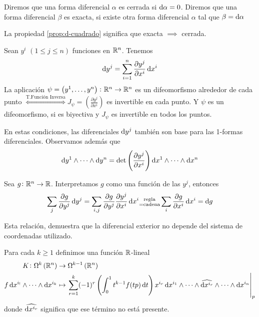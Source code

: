\begin{defi}
    Diremos que una forma diferencial $\alpha$ es cerrada si $\dif \alpha =0$. Diremos que una forma diferencial $\beta$ es exacta, si existe otra
    forma diferencial $\alpha$ tal que $\beta = \dif \alpha$
\end{defi}

\begin{obs*}
    La propiedad \ref{prop:d-cuadrado} significa que exacta $\implies$ cerrada.
\end{obs*}

\begin{prop}
    Sean $y^i$ $(1 \leq j \leq n)$ funciones en $\mathbb{R}^n$. Tenemos
    \[
        \dif y^j = \sum^n_{i=1} \frac{\partial y^j}{\partial x^i} \dif x^i
    \]
    La aplicación $\psi = \left( y^1, \dots, y^n \right) \colon \mathbb{R}^n \to \mathbb{R}^n$ es un difeomorfismo alrededor de cada punto
    $\stackrel{\text{T.Función Inversa}}{\iff} J_\psi = \left( \frac{\partial y^j}{\partial x^i} \right)$ es invertible en cada punto.
    Y $\psi$ es un difeomorfismo, si es biyectiva y $J_\psi$ es invertible en todos los puntos.

    En estas condiciones, las diferenciales $\dif y^j$ tambi\'en son base para las 1-formas diferenciales. Observamos además que
    \[
        \dif y^1 \wedge \cdots \wedge \dif y^n = \det \left( \frac{\partial y^j}{\partial x^i} \right) \dif x^1 \wedge \cdots \wedge \dif x^n
    \]
\end{prop}

\begin{obs}
    Sea $g \colon \mathbb{R}^n \to \mathbb{R}$. Interpretamos $g$ como una función de las $y^j$, entonces
    \[
        \sum_j \frac{\partial g}{\partial y^j} \dif y^j = \sum_{i, j} \frac{\partial g}{\partial y^j} \frac{\partial y^j}{\partial x^i} \dif x^i
        \substack{\text{regla} \\ = \text{cadena}} \sum_i \frac{\partial g}{\partial x^i} \dif x^i = \dif g
    \]

    Esta relación, demuestra que la diferencial exterior no depende del sistema de coordenadas utilizado.
\end{obs}

\begin{defi}
    Para cada $k \geq 1$ definimos una función $\mathbb{R}$-lineal
    \[
        \begin{aligned}
            K \colon \Omega^k\left( \real^n \right) &\to \Omega^{k-1}\left( \real^n \right) \\
            f \dif x^{i_!} \wedge \cdots \wedge \dif x^{i_k} &\mapsto \left. \sum^k_{r=1} (-1)^r \left( \int^1_0 t^{k-1} f(tp) \dif t\right) x^{i_r}
            \dif x^{i_1} \wedge \cdots \wedge \widehat{\dif x^{i_r}} \wedge \cdots \wedge \dif x^{i_n} \right\vert_p
        \end{aligned}
    \]
    donde $\widehat{\dif x^{i_r}}$ significa que ese t\'ermino no está presente.
\end{defi}

